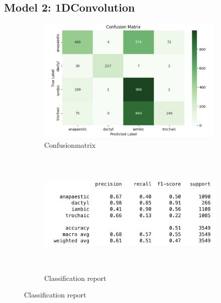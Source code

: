 \documentclass{article}
\begin{document}
\subsection*{Model 2: 1DConvolution}
\begin{figure}[h!] 
\begin{subfigure}{0.5\textwidth}
\includegraphics[width=0.9\linewidth, height=6cm]{images/1DCONV_f.png} 
\centering
\caption{Confusionmatrix }
\label{fig:addendum_ccon}
\end{subfigure}
\begin{subfigure}{0.5\textwidth}
\includegraphics[width=0.9\linewidth, height=6cm]{images/con1D_af.png} 
\centering
\caption{Classification report}
\label{fig:addendum_cclass}
\end{subfigure}
    
\end{figure}
\end{document}
